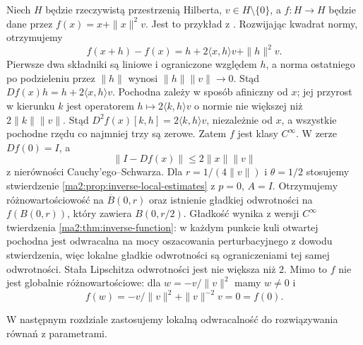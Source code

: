 \begin{przyklad}
\label{ma2:ex:inverse-hilbert}
Niech $H$ będzie rzeczywistą przestrzenią Hilberta,
$v\in H\setminus\{0\}$, a $f:H\to H$ będzie dane przez
$f(x)=x+\|x\|^2v$.
Jest to przykład z
.
Rozwijając kwadrat normy, otrzymujemy
\[
 f(x+h)-f(x)=h+2\langle x,h\rangle v+\|h\|^2v .
\]
Pierwsze dwa składniki są liniowe i ograniczone
względem $h$, a norma ostatniego po podzieleniu
przez $\|h\|$ wynosi $\|h\|\|v\|\to0$.
Stąd $Df(x)h=h+2\langle x,h\rangle v$.
Pochodna zależy w sposób afiniczny od $x$; jej
przyrost w kierunku $k$ jest operatorem
$h\mapsto2\langle k,h\rangle v$ o normie
nie większej niż $2\|k\|\|v\|$. Stąd
$D^2f(x)[k,h]=2\langle k,h\rangle v$, niezależnie od $x$,
a wszystkie pochodne rzędu co najmniej trzy są zerowe.
Zatem $f$ jest klasy $C^\infty$. W zerze $Df(0)=I$,
a
\[
 \|I-Df(x)\|\le2\|x\|\|v\|
\]
z nierówności Cauchy'ego--Schwarza.
Dla $r=1/(4\|v\|)$ i $\theta=1/2$ stosujemy
stwierdzenie \ref{ma2:prop:inverse-local-estimates}
z $p=0$, $A=I$. Otrzymujemy różnowartościowość
na $\overline B(0,r)$ oraz istnienie gładkiej
odwrotności na $f(B(0,r))$, który zawiera
$B(0,r/2)$. Gładkość wynika z wersji $C^\infty$
twierdzenia \ref{ma2:thm:inverse-function}: w każdym
punkcie kuli otwartej pochodna jest odwracalna na mocy
oszacowania perturbacyjnego z dowodu stwierdzenia,
więc lokalne gładkie odwrotności są ograniczeniami
tej samej odwrotności. Stała Lipschitza odwrotności
jest nie większa niż $2$.
Mimo to $f$ nie jest globalnie różnowartościowe:
dla $w=-v/\|v\|^2$ mamy $w\ne0$ i
\[
 f(w)=-v/\|v\|^2+\|v\|^{-2}v=0=f(0).
\]
\end{przyklad}

W następnym rozdziale zastosujemy lokalną
odwracalność do rozwiązywania równań z parametrami.
